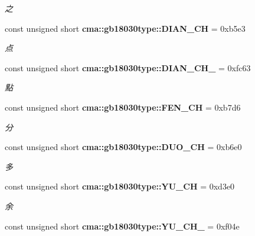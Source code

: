 \begin{CompactItemize}
\begin{CompactList}\small\item\em 之 \item\end{CompactList}\item 
const unsigned short {\bf cma::gb18030type::DIAN\_\-CH} = 0xb5e3\label{namespacecma_1_1gb18030type_249089d45bc259767148e2aa565b6316}

\begin{CompactList}\small\item\em 点 \item\end{CompactList}\item 
const unsigned short {\bf cma::gb18030type::DIAN\_\-CH\_} = 0xfc63\label{namespacecma_1_1gb18030type_de869695ecde35a0727ce2f4883820af}

\begin{CompactList}\small\item\em 點 \item\end{CompactList}\item 
const unsigned short {\bf cma::gb18030type::FEN\_\-CH} = 0xb7d6\label{namespacecma_1_1gb18030type_c216d94107d4637a8f871a83275f9f63}

\begin{CompactList}\small\item\em 分 \item\end{CompactList}\item 
const unsigned short {\bf cma::gb18030type::DUO\_\-CH} = 0xb6e0\label{namespacecma_1_1gb18030type_d2e2292024645f6e80865482925613ae}

\begin{CompactList}\small\item\em 多 \item\end{CompactList}\item 
const unsigned short {\bf cma::gb18030type::YU\_\-CH} = 0xd3e0\label{namespacecma_1_1gb18030type_e5bb6bf858939fb4428cd65e87d3f9a8}

\begin{CompactList}\small\item\em 余 \item\end{CompactList}\item 
const unsigned short \textbf{cma::gb18030type::YU\_\-CH\_} = 0xf04e\label{namespacecma_1_1gb18030type_8b51c8d05c19b0fe874049282eaa10e9}


\end{CompactItemize}
